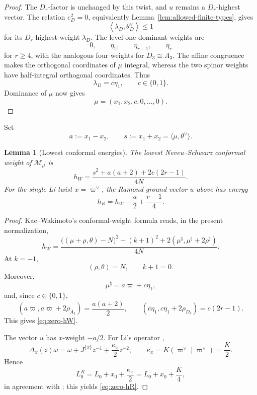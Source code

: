 \documentclass[11pt]{amsart}
\newtheorem{lemma}[theorem]{Lemma}
\theoremstyle{remark}
\numberwithin{equation}{section}
\begin{document}
\begin{proof}
The \(D_r\)-factor is unchanged by this twist, and \(u\) remains a
\(D_r\)-highest vector.  The relation \(e_D^2=0\), equivalently
Lemma~\ref{lem:allowed-finite-types}, gives
\[
   \left\langle
      \lambda_D,\theta_D^\vee
   \right\rangle
   \le1
\]
for its \(D_r\)-highest weight \(\lambda_D\).  The level-one dominant
weights are
\[
   0,\qquad
   \eta_1,\qquad
   \eta_{r-1},\qquad
   \eta_r
\]
for \(r\ge4\), with the analogous four weights for
\(D_3\cong A_3\).  The affine congruence makes the orthogonal coordinates of
\(\mu\) integral, whereas the two spinor weights have half-integral
orthogonal coordinates.  Thus
\[
   \lambda_D=c\eta_1,
   \qquad
   c\in\{0,1\}.
\]
Dominance of \(\mu\) now gives
\[
   \mu=(x_1,x_2,c,0,\ldots,0).
\]
\end{proof}

Set
\begin{equation}
   a:=x_1-x_2,
   \qquad
   s:=x_1+x_2
   =
   \langle\mu,\theta^\vee\rangle.
\end{equation}

\begin{lemma}[Lowest conformal energies]
\label{lem:zero-orbit-energies}
The lowest Neveu--Schwarz conformal weight of \(\mathcal M_\mu\) is
\begin{equation}
\label{eq:zero-hW}
   h_W
   =
   \frac{
      s^2+a(a+2)+2c(2r-1)
   }{4N}.
\end{equation}
For the single Li twist \(x=\varpi^\vee\), the Ramond ground vector \(u\)
above has energy
\begin{equation}
\label{eq:zero-hR}
   h_R
   =
   h_W-\frac a2+\frac{r-1}{4}.
\end{equation}
\end{lemma}

\begin{proof}
Kac--Wakimoto's conformal-weight formula
\cite[Equation~(7.6)]{KacWakimoto2004} reads, in the present normalization,
\[
   h_W
   =
   \frac{
      \bigl((\mu+\rho,\theta)-N\bigr)^2-(k+1)^2
      +2(\mu^\natural,\mu^\natural+2\rho^\natural)
   }{4N}.
\]
At \(k=-1\),
\[
   (\rho,\theta)=N,
   \qquad
   k+1=0.
\]
Moreover,
\[
   \mu^\natural=a\varpi+c\eta_1,
\]
and, since \(c\in\{0,1\}\),
\[
   (a\varpi,a\varpi+2\rho_{A_1})
   =\frac{a(a+2)}2,
   \qquad
   (c\eta_1,c\eta_1+2\rho_{D_r})
   =c(2r-1).
\]
This gives \eqref{eq:zero-hW}.

The vector \(u\) has \(x\)-weight \(-a/2\).  For Li's operator
\cite[Proposition~5.4]{Li1996},
\[
   \Delta_x(z)\omega
   =\omega+J^{\{x\}}z^{-1}+\frac{\kappa_x}{2}z^{-2},
   \qquad
   \kappa_x=K(\varpi^\vee\mid\varpi^\vee)=\frac K2.
\]
Hence
\[
   L_0^R=L_0+x_0+\frac{\kappa_x}{2}
   =L_0+x_0+\frac K4,
\]
in agreement with \cite[Equation~(62)]{Jin2026}; this yields
\eqref{eq:zero-hR}.
\end{proof}
\end{document}
